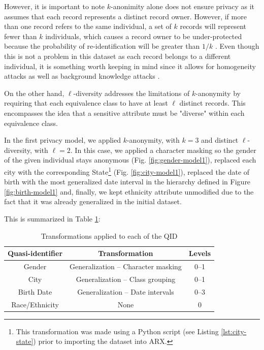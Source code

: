 \documentclass[a4paper, 11pt]{article}
\begin{document}
However, it is important to note $k$-anonimity alone does not ensure privacy as 
it assumes that each record represents a distinct record owner. However, if 
more than one record refers to the same individual, a set of $k$ records will 
represent fewer than $k$ individuals, which causes a record owner to be 
under-protected because the probability of re-identification will be greater 
than $1/k$ \cite{10.5555/1855031}. Even though this is not a problem in this 
dataset as each record belongs to a different individual, it is something worth 
keeping in mind since it allows for homogeneity attacks as well as background 
knowledge attacks \cite{Machanavajjhala2006LdiversityPB}.

On the other hand, $\ell$-diversity addresses the limitations of $k$-anonymity 
by requiring that each equivalence class to have at least $\ell$ distinct 
records. This encompasses the idea that a sensitive attribute must be "diverse" 
within each equivalence class. 

\pagebreak

In the first privacy model, we applied $k$-anonymity, with $k = 3$ and distinct 
$\ell$-diversity, with $\ell = 2$. In this case, we applied a character masking 
so the gender of the given individual stays anonymous (Fig. 
\ref{fig:gender-model1}), replaced each city with the corresponding 
State\footnote{This transformation was made using a Python script (see Listing 
\ref{lst:city-state}) prior to importing the dataset into ARX.} (Fig. 
\ref{fig:city-model1}), replaced the date of birth with the most generalized 
date interval in the hierarchy defined in Figure \ref{fig:birth-model1} and, 
finally, we kept ethnicity  attribute unmodified due to the fact that it was 
already generalized in the initial dataset.

This is summarized in Table \ref{tab:qid-transformation-model1}:\\

\begin{table}[H]
	\centering
	\begin{tabular}{|c|c|c|}
		\hline
		\textbf{Quasi-identifier} & \textbf{Transformation}          &   
		\textbf{Levels} \\ \hline
		Gender                    & Generalization -- Character masking 
		& 0--1            \\ \hline
		City                      & Generalization -- Class grouping &   
		0--1             \\ \hline
		Birth Date                & Generalization -- Date intervals &   
		0--3             \\ \hline
		Race/Ethnicity            & None                             &   
		0              \\ \hline
	\end{tabular}
	\caption{Transformations applied to each of the QID}
	\label{tab:qid-transformation-model1}
\end{table}
\end{document}

